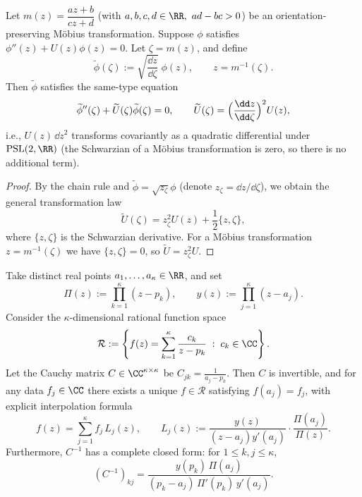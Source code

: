 \begin{conclusion}\label{con:xi-terminal-schrodinger-psl2r-quadratic-differential-covariance}
Let \(m(z)=\dfrac{az+b}{cz+d}\) (with \(a,b,c,d\in\RR,\ ad-bc>0\)) be an orientation-preserving Möbius transformation.
Suppose \(\phi\) satisfies \(\phi''(z)+U(z)\phi(z)=0\).
Let \(\zeta=m(z)\), and define
\[
\widetilde\phi(\zeta):=\sqrt{\frac{\dd z}{\dd\zeta}}\;\phi(z),\qquad z=m^{-1}(\zeta).
\]
Then \(\widetilde\phi\) satisfies the same-type equation
\[
\widetilde\phi''(\zeta)+\widetilde U(\zeta)\widetilde\phi(\zeta)=0,
\qquad
\widetilde U(\zeta)=\Bigl(\frac{\dd z}{\dd\zeta}\Bigr)^{2}U(z),
\]
i.e., \(U(z)\,\dd z^{2}\) transforms covariantly as a quadratic differential under \(\mathrm{PSL}(2,\RR)\) (the Schwarzian of a Möbius transformation is zero, so there is no additional term).
\end{conclusion}
\begin{proof}
By the chain rule and \(\widetilde\phi=\sqrt{z_\zeta}\phi\) (denote \(z_\zeta=\dd z/\dd\zeta\)), we obtain the general transformation law
\[
\widetilde U(\zeta)=z_\zeta^{2}U(z)+\frac12\{z,\zeta\},
\]
where \(\{z,\zeta\}\) is the Schwarzian derivative.
For a Möbius transformation \(z=m^{-1}(\zeta)\) we have \(\{z,\zeta\}=0\), so \(\widetilde U=z_\zeta^{2}U\).
\end{proof}
\begin{conclusion}\label{con:xi-terminal-cauchy-lagrange-rational-interpolation-cauchy-inverse}
Take distinct real points \(a_1,\dots,a_\kappa\in\RR\), and set
\[
\Pi(z):=\prod_{k=1}^{\kappa}(z-p_k),\qquad
y(z):=\prod_{j=1}^{\kappa}(z-a_j).
\]
Consider the \(\kappa\)-dimensional rational function space
\[
\mathcal R:=\left\{f(z)=\sum_{k=1}^{\kappa}\frac{c_k}{z-p_k}\;:\;c_k\in\CC\right\}.
\]
Let the Cauchy matrix \(C\in\CC^{\kappa\times\kappa}\) be \(C_{jk}=\frac{1}{a_j-p_k}\).
Then \(C\) is invertible, and for any data \(f_j\in\CC\) there exists a unique \(f\in\mathcal R\) satisfying \(f(a_j)=f_j\), with explicit interpolation formula
\[
f(z)=\sum_{j=1}^{\kappa} f_j\,L_j(z),
\qquad
L_j(z):=\frac{y(z)}{(z-a_j)y'(a_j)}\cdot\frac{\Pi(a_j)}{\Pi(z)}.
\]
Furthermore, \(C^{-1}\) has a complete closed form: for \(1\le k,j\le\kappa\),
\[
(C^{-1})_{k j}
=\frac{y(p_k)\,\Pi(a_j)}{(p_k-a_j)\,\Pi'(p_k)\,y'(a_j)}.
\]
\end{conclusion}
